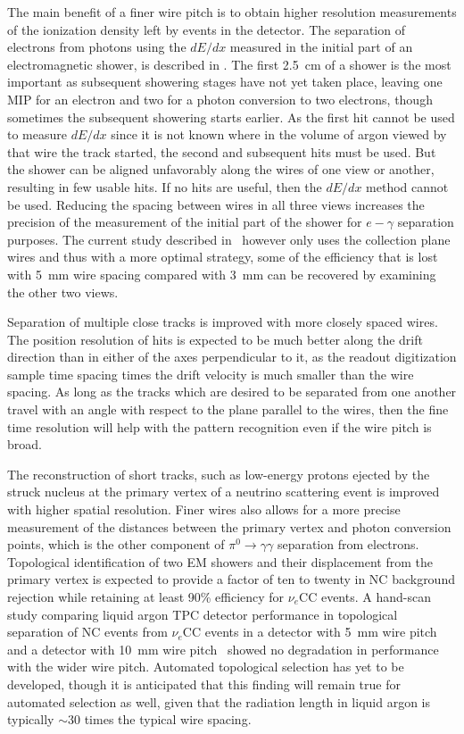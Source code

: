 The main benefit of a finer wire pitch is to obtain higher resolution
measurements of the ionization density left by events in the detector.
The separation of electrons from photons using the $dE/dx$ measured in
the initial part of an electromagnetic shower, is described in
\anxreco.  The first 2.5~cm of a shower is the most important as
subsequent showering stages have not yet taken place, leaving one MIP
for an electron and two for a photon conversion to two electrons,
though sometimes the subsequent showering starts earlier.  As the
first hit cannot be used to measure $dE/dx$ since it is not known
where in the volume of argon viewed by that wire the track started,
the second and subsequent hits must be used.  But the shower can be
aligned unfavorably along the wires of one view or another, resulting
in few usable hits.  If no hits are useful, then the $dE/dx$ method
cannot be used.  Reducing the spacing between wires in all three views
increases the precision of the measurement of the initial part of the
shower for $e-\gamma$ separation purposes.  The current study
described in \anxreco\ however only uses the collection plane wires and
thus with a more optimal strategy, some of the efficiency that is lost
with 5~mm wire spacing compared with 3~mm can be recovered by
examining the other two views.

Separation of multiple close tracks is improved with more closely
spaced wires.  The position resolution of hits is expected to be much
better along the drift direction than in either of the axes
perpendicular to it, as the readout digitization sample time spacing
times the drift velocity is much smaller than the wire spacing.  As
long as the tracks which are desired to be separated from one another
travel with an angle with respect to the plane parallel to the wires,
then the fine time resolution will help with the pattern recognition
even if the wire pitch is broad.

The reconstruction of short tracks, such as low-energy protons ejected
by the struck nucleus at the primary vertex of a neutrino scattering
event is improved with higher spatial resolution.  Finer wires also
allows for a more precise measurement of the distances between the
primary vertex and photon conversion points, which is the other
component of $\pi^0\rightarrow\gamma\gamma$ separation from electrons.
Topological identification of two EM showers and their displacement
from the primary vertex is expected to provide a factor of ten to
twenty in NC background rejection while retaining at least 90\%
efficiency for $\nu_e$CC events.  A hand-scan study comparing liquid
argon TPC detector performance in topological separation of NC events
from $\nu_e$CC events in a detector with 5~mm wire pitch and a
detector with 10~mm wire pitch~\cite{2008-hand-scan} showed no
degradation in performance with the wider wire pitch.  Automated
topological selection has yet to be developed, though it is
anticipated that this finding will remain true for automated selection
as well, given that the radiation length in liquid argon is typically
$\sim$30 times the typical wire spacing.

